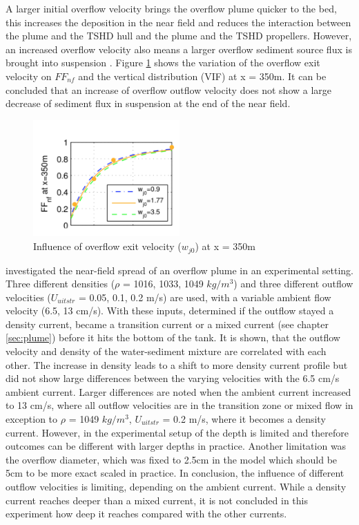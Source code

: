 A larger initial overflow velocity brings the overflow plume quicker to the bed, this increases the deposition in the near field and reduces the interaction between the plume and the TSHD hull and the plume and the TSHD propellers. However, an increased overflow velocity also means a larger overflow sediment source flux is brought into suspension \citep{Dewit}. Figure \ref{fig:Overflow_exit_velocity} shows the variation of the overflow exit velocity on $FF_{nf}$ and the vertical distribution (VIF) at x = 350m. It can be concluded that an increase of overflow outflow velocity does not show a large decrease of sediment flux in suspension at the end of the near field.


\begin{figure}[ht!]
    \centering
    \includegraphics[width = 0.5\textwidth]{Images/Overflow_exit_velocity.png}
    \caption{Influence of overflow exit velocity ($w_{j0}$) at x = 350m}
    \label{fig:Overflow_exit_velocity}
\end{figure}

\noindent \cite{Boot} investigated the near-field spread of an overflow plume in an experimental setting. Three different densities ($\rho$ =  1016, 1033, 1049 $kg/m^3$) and three different outflow velocities ($U_{uitstr}$ =  0.05, 0.1, 0.2 m/s) are used, with a variable ambient flow velocity (6.5, 13 cm/s). With these inputs, \cite{Boot} determined if the outflow stayed a density current, became a transition current or a mixed current (see chapter \ref{sec:plume}) before it hits the bottom of the tank. It is shown, that the outflow velocity and density of the water-sediment mixture are correlated with each other. The increase in density leads to a shift to more density current profile but did not show large differences between the varying velocities with the 6.5 cm/s ambient current. Larger differences are noted when the ambient current increased to 13 cm/s, where all outflow velocities are in the transition zone or mixed flow in exception to $\rho$ =  1049 $kg/m^3$, $U_{uitstr}$ =  0.2 m/s, where it becomes a density current.\newline
\noindent However, in the experimental setup of \cite{Boot} the depth is limited and therefore outcomes can be different with larger depths in practice. Another limitation was the overflow diameter, which was fixed to 2.5cm in the model which should be 5cm to be more exact scaled in practice. In conclusion, the influence of different outflow velocities is limiting, depending on the ambient current. While a density current reaches deeper than a mixed current, it is not concluded in this experiment how deep it reaches compared with the other currents.




